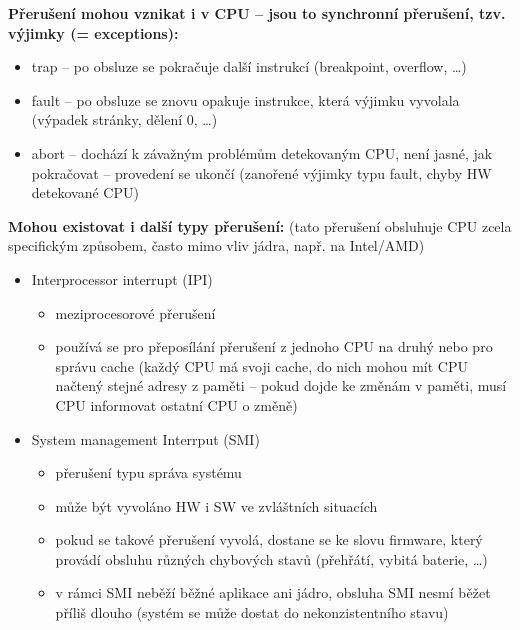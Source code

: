 \documentclass[a4paper, 11pt]{article}
\begin{document}
\textbf{Přerušení mohou vznikat i v CPU -- jsou to synchronní přerušení, tzv. výjimky (= exceptions):}
\begin{itemize}
    \item trap -- po obsluze se pokračuje další instrukcí (breakpoint, overflow, \ldots)
    \item fault -- po obsluze se znovu opakuje instrukce, která výjimku vyvolala (výpadek stránky, dělení 0, \ldots)
    \item abort -- dochází k závažným problémům detekovaným CPU, není jasné, jak pokračovat -- provedení se ukončí (zanořené výjimky typu fault, chyby HW detekované CPU)
\end{itemize}

\textbf{Mohou existovat i další typy přerušení:} (tato přerušení obsluhuje CPU zcela specifickým způsobem, často mimo vliv jádra, např. na Intel/AMD)
\begin{itemize}
    \item Interprocessor interrupt (IPI)
    \begin{itemize}
        \item meziprocesorové přerušení
        \item používá se pro přeposílání přerušení z jednoho CPU na druhý nebo pro správu cache (každý CPU má svoji cache, do nich mohou mít CPU načtený stejné adresy z paměti -- pokud dojde ke změnám v paměti, musí CPU informovat ostatní CPU o změně)
    \end{itemize}
    \item System management Interrput (SMI)
    \begin{itemize}
        \item přerušení typu správa systému
        \item může být vyvoláno HW i SW ve zvláštních situacích
        \item pokud se takové přerušení vyvolá, dostane se ke slovu firmware, který provádí obsluhu různých chybových stavů (přehřátí, vybitá baterie, \ldots)
        \item v rámci SMI neběží běžné aplikace ani jádro, obsluha SMI nesmí běžet příliš dlouho (systém se může dostat do nekonzistentního stavu)
    \end{itemize}
\end{itemize}
\end{document}
